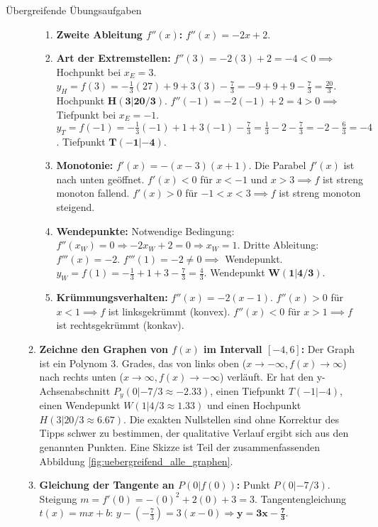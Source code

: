 \begin{loesungsumgebung}{Übergreifende Übungsaufgaben}
\begin{enumerate}
\begin{enumerate}[label=(\alph*)]
\begin{enumerate}[label=\arabic*.]
            \item \textbf{Zweite Ableitung $f''(x)$:} $f''(x) = -2x + 2$.
            \item \textbf{Art der Extremstellen:}
            $f''(3) = -2(3)+2 = -4 < 0 \implies$ Hochpunkt bei $x_E=3$.
            $y_H = f(3) = -\frac{1}{3}(27) + 9 + 3(3) - \frac{7}{3} = -9+9+9-\frac{7}{3} = \frac{20}{3}$. Hochpunkt $\mathbf{H(3|20/3)}$.
            $f''(-1) = -2(-1)+2 = 4 > 0 \implies$ Tiefpunkt bei $x_E=-1$.
            $y_T = f(-1) = -\frac{1}{3}(-1) + 1 + 3(-1) - \frac{7}{3} = \frac{1}{3} - 2 - \frac{7}{3} = -2 - \frac{6}{3} = -4$. Tiefpunkt $\mathbf{T(-1|-4)}$.
            \item \textbf{Monotonie:} $f'(x) = -(x-3)(x+1)$. Die Parabel $f'(x)$ ist nach unten geöffnet.
            $f'(x) < 0$ für $x < -1$ und $x > 3 \implies f$ ist streng monoton fallend.
            $f'(x) > 0$ für $-1 < x < 3 \implies f$ ist streng monoton steigend.
            \item \textbf{Wendepunkte:} Notwendige Bedingung: $f''(x_W)=0 \Rightarrow -2x_W+2=0 \Rightarrow x_W=1$.
            Dritte Ableitung: $f'''(x)=-2$. $f'''(1)=-2 \neq 0 \implies$ Wendepunkt.
            $y_W = f(1) = -\frac{1}{3} + 1 + 3 - \frac{7}{3} = \frac{4}{3}$. Wendepunkt $\mathbf{W(1|4/3)}$.
            \item \textbf{Krümmungsverhalten:} $f''(x)=-2(x-1)$.
            $f''(x) > 0$ für $x < 1 \implies f$ ist linksgekrümmt (konvex).
            $f''(x) < 0$ für $x > 1 \implies f$ ist rechtsgekrümmt (konkav).
        \end{enumerate}
        \item \textbf{Zeichne den Graphen von $f(x)$ im Intervall $[-4, 6]$:}
        Der Graph ist ein Polynom 3. Grades, das von links oben ($x \to -\infty, f(x) \to \infty$) nach rechts unten ($x \to \infty, f(x) \to -\infty$) verläuft. Er hat den y-Achsenabschnitt $P_y(0|-7/3 \approx -2.33)$, einen Tiefpunkt $T(-1|-4)$, einen Wendepunkt $W(1|4/3 \approx 1.33)$ und einen Hochpunkt $H(3|20/3 \approx 6.67)$. Die exakten Nullstellen sind ohne Korrektur des Tipps schwer zu bestimmen, der qualitative Verlauf ergibt sich aus den genannten Punkten. Eine Skizze ist Teil der zusammenfassenden Abbildung \ref{fig:uebergreifend_alle_graphen}.
        \item \textbf{Gleichung der Tangente an $P(0|f(0))$:}
        Punkt $P(0|-7/3)$. Steigung $m = f'(0) = -(0)^2+2(0)+3 = 3$.
        Tangentengleichung $t(x) = mx+b$: $y - (-\frac{7}{3}) = 3(x-0) \Rightarrow \mathbf{y = 3x - \frac{7}{3}}$.

\end{enumerate}
\end{enumerate}
\end{loesungsumgebung}
